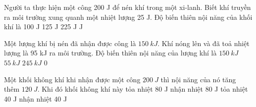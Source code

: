 \begin{ex}%
	Người ta thực hiện một công 200 J để nén khí trong một xi-lanh. Biết khí truyền ra môi trường xung quanh một nhiệt lượng 25 J. Độ biến thiên nội năng của khối khí là
	\choice
	{100 J}
	{125 J}
	{225 J}
	{ J}
	\end{ex}
\begin{ex}
	Một lượng khí bị nén đã nhận được công là $150 \ kJ$. Khí nóng lên và đã toả nhiệt lượng là 95 kJ ra môi trường. Độ biến thiên nội năng của lượng khí là
	\choice
	{$150 \ kJ$}
	{\True $55 \ kJ$}
	{$245 \ kJ$}
	{0}
	\end{ex}
\begin{ex} 
	Một khối không khí khi nhận được một công $200 \ J$ thì nội năng của nó tăng thêm $120 \ J$. Khi đó khối không khí này
	\choice
	{\True tỏa nhiệt 80 J}
	{nhận nhiệt 80 J}
	{tỏa nhiệt 40 J}
	{nhận nhiệt 40 J}
\end{ex}
